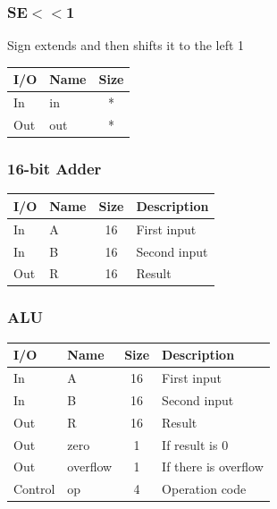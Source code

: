 \documentclass{article}
\begin{document}
		\subsubsection{SE$<<$1}
			\begin{center} Sign extends and then shifts it to the left 1 \end{center}
			\begin{center} \begin{tabular}{| l | l | c |} \hline 
				I/O & Name & Size \\ \hline 
				In  & in   & * \\ \hline
				Out & out  & * \\ \hline
			\end{tabular} \end{center}
		\subsubsection{16-bit Adder}
			\begin{center} \begin{tabular}{| l | l | c | l |} \hline 
				I/O & Name     & Size & Description \\ \hline 
				In  & A        & 16   & First input \\ \hline
				In  & B        & 16   & Second input \\ \hline
				Out & R        & 16   & Result \\ \hline
			\end{tabular} \end{center}
		\subsubsection{ALU}
			\begin{center} \begin{tabular}{| l | l | c | l |} \hline 
				I/O & Name     & Size & Description \\ \hline 
				In  & A        & 16   & First input \\ \hline
				In  & B        & 16   & Second input \\ \hline
				Out & R        & 16   & Result \\ \hline
				Out & zero     & 1    & If result is 0 \\ \hline
				Out & overflow & 1    & If there is overflow \\ \hline
				Control & op   & 4    & Operation code \\ \hline
			\end{tabular} \end{center}
\end{document}
